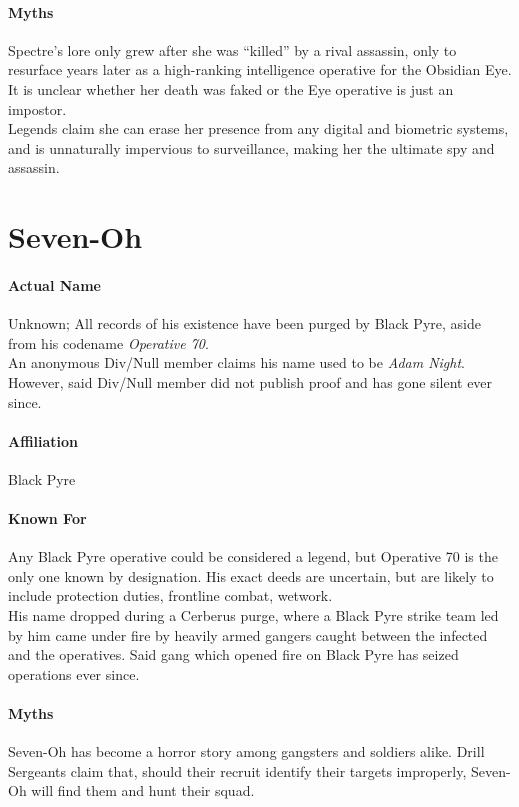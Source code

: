 \paragraph{Myths}
	Spectre’s lore only grew after she was “killed” by a rival assassin, only to resurface years later as a high-ranking intelligence operative for the Obsidian Eye.
	It is unclear whether her death was faked or the Eye operative is just an impostor.
	\\%
	Legends claim she can erase her presence from any digital and biometric systems, and is unnaturally impervious to surveillance, making her the ultimate spy and assassin.

\section*{Seven-Oh}
\paragraph{Actual Name}
	Unknown; All records of his existence have been purged by Black Pyre, aside from his codename \emph{Operative 70}.
	\\%
	An anonymous Div/Null member claims his name used to be \emph{Adam Night}.
	However, said Div/Null member did not publish proof and has gone silent ever since.
\paragraph{Affiliation}
	Black Pyre
\paragraph{Known For}
	Any Black Pyre operative could be considered a legend, but Operative 70 is the only one known by designation.
	His exact deeds are uncertain, but are likely to include protection duties, frontline combat, wetwork.
	\\%
	His name dropped during a Cerberus purge, where a Black Pyre strike team led by him came under fire by heavily armed gangers caught between the infected and the operatives.
	Said gang which opened fire on Black Pyre has seized operations ever since.
\paragraph{Myths}
	Seven-Oh has become a horror story among gangsters and soldiers alike.
	Drill Sergeants claim that, should their recruit identify their targets improperly, Seven-Oh will find them and hunt their squad.

